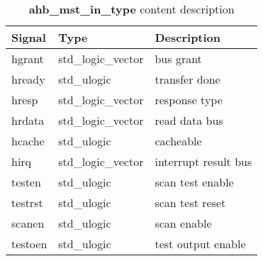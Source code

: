 \begin{table}[H]
\centering
\label{table:abhitype}
\begin{tabular}{l l p{55mm}}
\textbf{Signal} & \textbf{Type}      	& \textbf{Description}                  \\ \hline \hline
    hgrant	& std\_logic\_vector 	& bus grant                             \\ \hline
    hready	& std\_ulogic       	& transfer done                         \\ \hline
    hresp	& std\_logic\_vector	& response type                         \\ \hline
    hrdata	& std\_logic\_vector	& read data bus                         \\  \hline
    hcache	& std\_ulogic       	& cacheable                             \\ \hline
    hirq  	& std\_logic\_vector	& interrupt result bus                  \\ \hline
    testen	& std\_ulogic       	& scan test enable                      \\ \hline
    testrst	& std\_ulogic           & scan test reset          		\\  \hline
    scanen 	& std\_ulogic           & scan enable              		\\ \hline
    testoen 	& std\_ulogic           & test output enable      	 	\\ \hline
 \end{tabular}                                                                                                                         
\caption{\textbf{ahb\_mst\_in\_type} content description}                                                                                      
\end{table}                                                                                             

  
  
